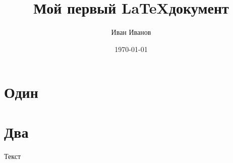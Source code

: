 \documentclass{article}
\author{Иван Иванов}
\title{Мой первый \LaTeX документ}
\date{\today} %
\begin{document}
\maketitle

\newpage

\tableofcontents{}
\newpage

\section{Один}
\section{Два}

Текст
\end{document}
